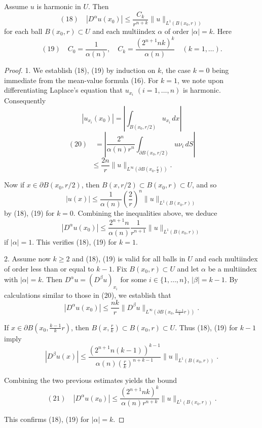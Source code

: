 \begin{theorem}
\label{thm:harmonic-function-derivative-estimates}
Assume $u$ is harmonic in $U$. Then
$$(18) \quad |D^\alpha u(x_0)| \leq \frac{C_k}{r^{n+k}} \|u\|_{L^1(B(x_0,r))}$$
for each ball $B(x_0,r) \subset U$ and each multiindex $\alpha$ of order $|\alpha| = k$. Here
$$(19) \quad C_0 = \frac{1}{\alpha(n)}, \quad C_k = \frac{(2^{n+1}nk)^k}{\alpha(n)} \quad (k = 1,\ldots).$$
\end{theorem}

\begin{proof}
1. We establish (18), (19) by induction on $k$, the case $k=0$ being immediate from the mean-value formula (16). For $k=1$, we note upon differentiating Laplace's equation that $u_{x_i}$ $(i=1,\ldots,n)$ is harmonic. Consequently
$$|u_{x_i}(x_0)| = \left|\int_{B(x_0,r/2)} u_{x_i}\,dx\right|$$
$$(20) \quad = \left|\frac{2^n}{\alpha(n)r^n}\int_{\partial B(x_0,r/2)} u\nu_i\,dS\right|$$
$$\leq \frac{2n}{r}\|u\|_{L^\infty(\partial B(x_0,\frac{r}{2}))}.$$

Now if $x \in \partial B(x_0,r/2)$, then $B(x,r/2) \subset B(x_0,r) \subset U$, and so
$$|u(x)| \leq \frac{1}{\alpha(n)}\left(\frac{2}{r}\right)^n \|u\|_{L^1(B(x_0,r))}$$
by (18), (19) for $k=0$. Combining the inequalities above, we deduce
$$|D^\alpha u(x_0)| \leq \frac{2^{n+1}n}{\alpha(n)}\frac{1}{r^{n+1}}\|u\|_{L^1(B(x_0,r))}$$
if $|\alpha| = 1$. This verifies (18), (19) for $k=1$.

2. Assume now $k \geq 2$ and (18), (19) is valid for all balls in $U$ and each multiindex of order less than or equal to $k-1$. Fix $B(x_0,r) \subset U$ and let $\alpha$ be a multiindex with $|\alpha| = k$. Then $D^\alpha u = (D^\beta u)_{x_i}$ for some $i \in \{1, \ldots, n\}$, $|\beta| = k - 1$. By calculations similar to those in (20), we establish that
$$|D^\alpha u(x_0)| \leq \frac{nk}{r}\|D^{\beta}u\|_{L^\infty(\partial B(x_0, \frac{k-1}{k}r))}.$$

If $x \in \partial B(x_0, \frac{k-1}{k}r)$, then $B(x, \frac{r}{k}) \subset B(x_0, r) \subset U$. Thus (18), (19) for $k - 1$ imply
$$|D^\beta u(x)| \leq \frac{(2^{n+1}n(k-1))^{k-1}}{\alpha(n)\left(\frac{r}{k}\right)^{n+k-1}}\|u\|_{L^1(B(x_0,r))}.$$

Combining the two previous estimates yields the bound
$$(21) \quad |D^\alpha u(x_0)| \leq \frac{(2^{n+1}nk)^k}{\alpha(n)r^{n+k}}\|u\|_{L^1(B(x_0,r))}.$$

This confirms (18), (19) for $|\alpha| = k$.
\end{proof}

